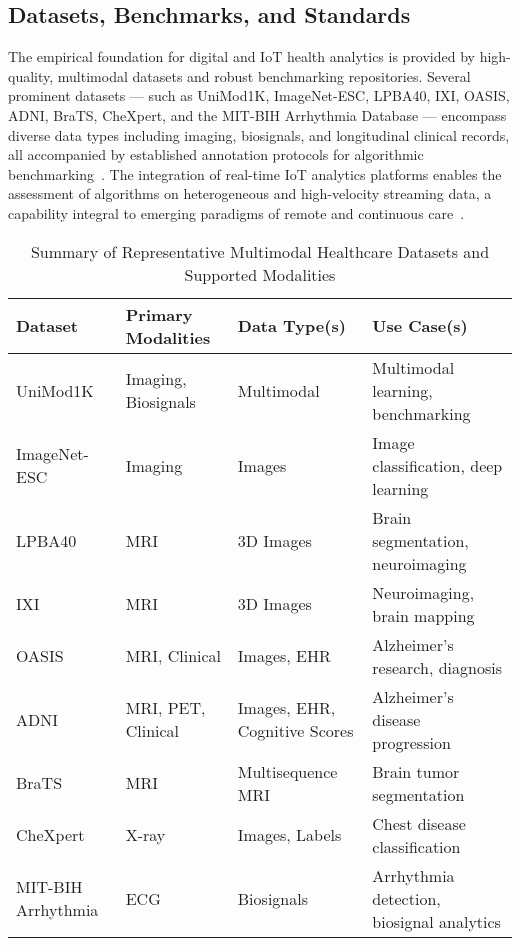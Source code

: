 \documentclass[sigconf]{acmart}
\begin{document}
\subsection{Datasets, Benchmarks, and Standards}

The empirical foundation for digital and IoT health analytics is provided by high-quality, multimodal datasets and robust benchmarking repositories. Several prominent datasets --- such as UniMod1K, ImageNet-ESC, LPBA40, IXI, OASIS, ADNI, BraTS, CheXpert, and the MIT-BIH Arrhythmia Database --- encompass diverse data types including imaging, biosignals, and longitudinal clinical records, all accompanied by established annotation protocols for algorithmic benchmarking~\cite{ref35,ref43,ref48,ref49,ref50,ref51,ref58,ref66,ref67,ref74,ref75,ref88,ref89,ref90,ref101,ref106}. The integration of real-time IoT analytics platforms enables the assessment of algorithms on heterogeneous and high-velocity streaming data, a capability integral to emerging paradigms of remote and continuous care~\cite{ref67,ref106}.

\begin{table*}[htbp]
\centering
\caption{Summary of Representative Multimodal Healthcare Datasets and Supported Modalities}
\label{tab:dataset_overview}
\begin{adjustbox}{max width=\textwidth}
\begin{tabular}{llll}
\toprule
\textbf{Dataset} & \textbf{Primary Modalities} & \textbf{Data Type(s)} & \textbf{Use Case(s)} \\
\midrule
UniMod1K & Imaging, Biosignals & Multimodal & Multimodal learning, benchmarking \\
ImageNet-ESC & Imaging & Images & Image classification, deep learning \\
LPBA40 & MRI & 3D Images & Brain segmentation, neuroimaging \\
IXI & MRI & 3D Images & Neuroimaging, brain mapping \\
OASIS & MRI, Clinical & Images, EHR & Alzheimer’s research, diagnosis \\
ADNI & MRI, PET, Clinical & Images, EHR, Cognitive Scores & Alzheimer’s disease progression \\
BraTS & MRI & Multisequence MRI & Brain tumor segmentation \\
CheXpert & X-ray & Images, Labels & Chest disease classification \\
MIT-BIH Arrhythmia & ECG & Biosignals & Arrhythmia detection, biosignal analytics \\
\bottomrule
\end{tabular}
\end{adjustbox}
\end{table*}
\end{document}
